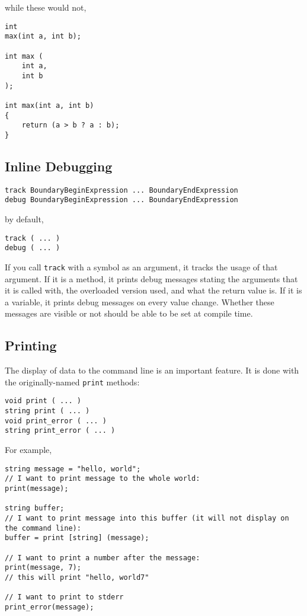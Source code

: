 \documentclass[10pt,a4paper]{article}
\begin{document}
while these would not,
\begin{verbatim}
int
max(int a, int b);

int max (
    int a,
    int b
);

int max(int a, int b)
{
    return (a > b ? a : b);
}
\end{verbatim}

\subsection{Inline Debugging}
\label{sec:inlineDebugging}
\begin{verbatim}
track BoundaryBeginExpression ... BoundaryEndExpression
debug BoundaryBeginExpression ... BoundaryEndExpression
\end{verbatim}

by default,
\begin{verbatim}
track ( ... )
debug ( ... )
\end{verbatim}

If you call \verb|track| with a symbol as an argument, it tracks the usage of that argument. If it is a method, it prints debug messages stating the arguments that it is called with, the overloaded version used, and what the return value is. If it is a variable, it prints debug messages on every value change. Whether these messages are visible or not should be able to be set at compile time.

\subsection{Printing}
\label{sec:printing}
The display of data to the command line is an important feature. It is done with the originally-named \verb|print| methods:
\begin{verbatim}
void print ( ... )
string print ( ... )
void print_error ( ... )
string print_error ( ... )
\end{verbatim}

For example,
\begin{verbatim}
string message = "hello, world";
// I want to print message to the whole world:
print(message);

string buffer;
// I want to print message into this buffer (it will not display on the command line):
buffer = print [string] (message);

// I want to print a number after the message:
print(message, 7);
// this will print "hello, world7"

// I want to print to stderr
print_error(message);
\end{verbatim}
\end{document}
